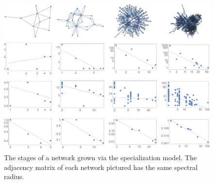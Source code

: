 \documentclass[12pt]{article}
\begin{document}
\begin{figure}[h]
\centering
\includegraphics[width=0.6\columnwidth]{specfig.pdf}
\caption{The stages of a network grown via the specialization model. The adjacency matrix of each network pictured has the same spectral radius.}
\label{fig:sinx}
\end{figure}
\end{document}

